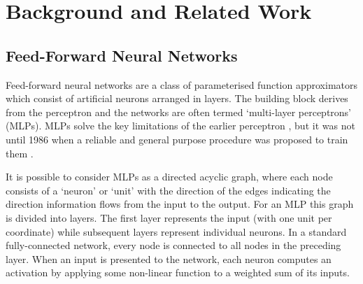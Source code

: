 \chapter{Background and Related Work}\label{C:bg}
\section{Feed-Forward Neural Networks}
Feed-forward neural networks are a class of parameterised function approximators which consist of
artificial neurons arranged in layers. The building block derives from the perceptron
\autocite{Rosenblatt1958} and the networks are often termed `multi-layer perceptrons' (MLPs). MLPs solve
the key limitations of the earlier perceptron \autocite{Minsky1969}, but it was not until 1986
when a reliable and general purpose procedure was 
proposed to train them \autocite{Rumelhart1986}.

It is possible to consider MLPs as a directed acyclic graph, where each node consists
of a `neuron' or `unit' with the direction of the edges indicating the direction information flows from
the input to the output. For an MLP this graph is divided into layers.
The first layer represents the input (with one unit per coordinate) while subsequent layers
represent individual neurons. In a standard fully-connected network, every node is connected to all
nodes in the preceding layer. When an input is presented to the network, each neuron computes
an activation by applying some non-linear function to a weighted sum of its inputs. 

